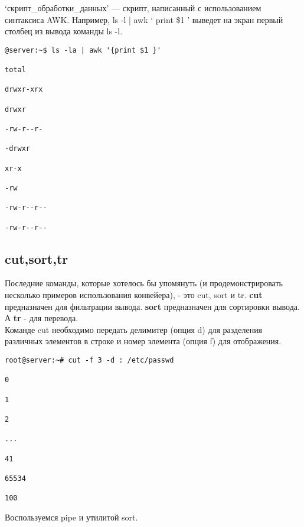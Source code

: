 \documentclass[14pt, a4paper]{article}
\begin{document}
\colorbox{backcolour}{‘{скрипт\_обработки\_данных}’} — скрипт, написанный с использованием синтаксиса AWK.
Например, \colorbox{backcolour}{ls -l | awk ‘{ print \$1 }’} выведет на экран первый столбец из вывода команды ls -l.

\vspace{0.3cm}

\begin{lstlisting}
@server:~$ ls -la | awk '{print $1 }'

total

drwxr-xrx

drwxr

-rw-r--r-

-drwxr

xr-x

-rw

-rw-r--r--

-rw-r--r--

\end{lstlisting}

\subsection*{cut,sort,tr} 

Последние команды, которые хотелось бы упомянуть (и продемонстрировать несколько примеров
использования конвейера), - это cut, sort и tr. \textbf{cut} предназначен для фильтрации вывода. \textbf{sort}
предназначен для сортировки вывода. А \textbf{tr} - для перевода.\\

Команде cut необходимо передать делимитер (опция d) для разделения различных элементов в
строке и номер элемента (опция f) для отображения.
\vspace{0.3cm}

\begin{lstlisting}
root@server:~# cut -f 3 -d : /etc/passwd

0

1

2

...

41

65534

100

\end{lstlisting}
\vspace{0.2cm}

Воспользуемся pipe и утилитой sort.

\vspace{0.3cm}
\end{document}
